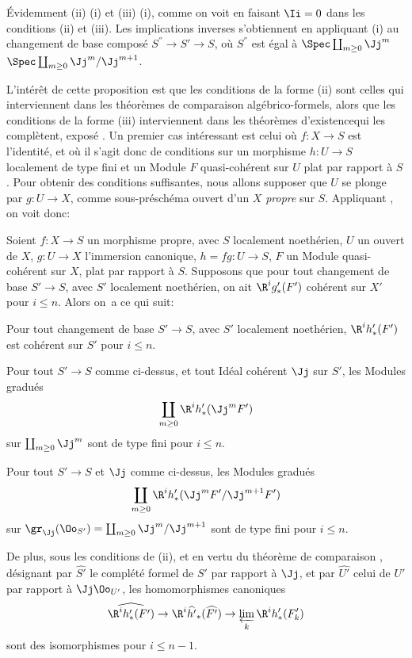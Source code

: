 \'Evidemment (ii) \ALORS (i) et (iii) \ALORS (i), comme on voit en faisant $\Ii=0$ dans les conditions (ii) et (iii). Les implications inverses s'obtiennent en appliquant (i) au changement de base compos\'e $S^{''}\to S'\to S$, o\`u $S^{''}$ est \'egal \`a $\Spec \coprod_{m\geq 0} \Jj^m$ \resp $\Spec \coprod_{m\geq 0} \Jj^m/\Jj^{m+1}$.

L'int\'er\^et de cette proposition est que les conditions de la forme (ii) sont celles qui interviennent dans les \og th\'eor\`emes de comparaison alg\'ebrico-formels\fg, alors que les conditions de la forme (iii) interviennent dans les \og th\'eor\`emes d'existence\fg qui les compl\`etent, \cf expos\'e . Un premier cas int\'eressant est celui o\`u $f:X\to S$ est l'identit\'e, et o\`u il s'agit donc de conditions sur un morphisme $h:U\to S$ localement de type fini et un Module $F$ quasi-coh\'erent sur $U$ plat par rapport \`a $S$. Pour obtenir des conditions suffisantes, nous allons supposer que $U$ se plonge par $g:U\to X$, comme sous-pr\'esch\'ema ouvert d'un $X$ \emph{propre} sur $S$. Appliquant , on voit donc:

\begin{corollaire} \label{XII.5.8}
Soient $f:X\to S$ un morphisme propre, avec $S$ localement noeth\'erien, $U$ un ouvert de $X$, $g:U\to X$ l'immersion canonique, $h=fg:U\to S$, $F$ un Module quasi-coh\'erent sur $X$, plat par rapport \`a $S$. Supposons que pour tout changement de base $S'\to S$, avec $S'$ localement noeth\'erien, on ait $\R^ig'_\ast(F')$ coh\'erent sur $X'$ pour $i\leq n$. Alors on~a ce qui suit:
\begin{enumeratei}
\item
Pour tout changement de base $S'\to S$, avec $S'$ localement noeth\'erien, $\R^ih'_\ast(F')$ est coh\'erent sur $S'$ pour $i\leq n$.
\item
Pour tout $S'\to S$ comme ci-dessus, et tout Id\'eal coh\'erent $\Jj$ sur $S'$, les Modules gradu\'es\pageoriginale
\[
\coprod_{m\geq 0} \R^ih'_\ast(\Jj^mF')
\]
sur $\coprod_{m\geq 0}\Jj^m$ sont de type fini pour $i\leq n$.
\item
Pour tout $S'\to S$ et $\Jj$ comme ci-dessus, les Modules gradu\'es
\[
\coprod_{m\geq 0} \R^ih'_\ast(\Jj^mF'/\Jj^{m+1}F')
\]
sur $\gr_\Jj(\Oo_{S'})=\coprod_{m\geq 0}\Jj^m/\Jj^{m+1}$ sont de type fini pour $i\leq n$.

De plus, sous les conditions de (ii), et en vertu du th\'eor\`eme de comparaison , d\'esignant par $\widehat{S'}$ le compl\'et\'e formel de $S'$ par rapport \`a $\Jj$, et par $\widehat{U'}$ celui de $U'$ par rapport \`a $\Jj\Oo_{U'}$, les homomorphismes canoniques
\[
\widehat{\R^ih'_\ast(F')} \to \R^i\widehat{h'}_\ast(\widehat{F'}) \to \varprojlim_k\R^ih'_\ast(F'_k)
\]
sont des isomorphismes pour $i\leq n-1$.
\end{enumeratei}
\end{corollaire}

